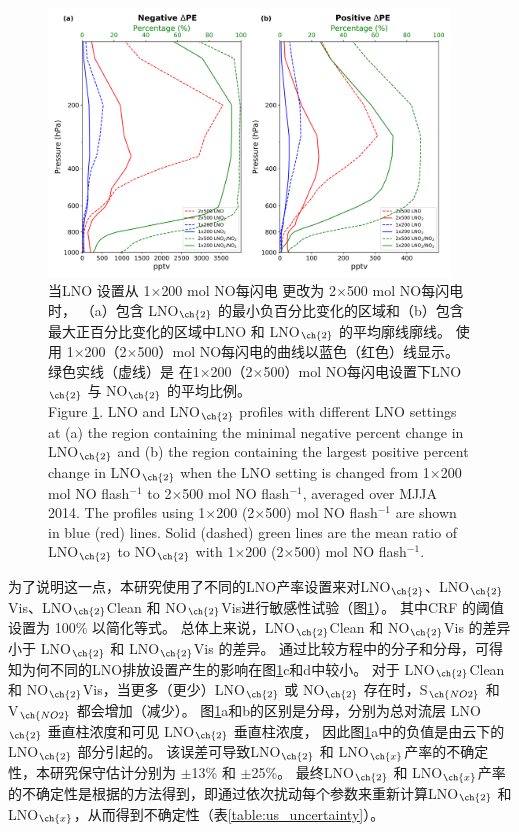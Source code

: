 \begin{figure}[H]
\centering
\includegraphics[width=0.95\textwidth]{./figures/us_lno2_profile.png}
\caption{当LNO 设置从 1$\times$200 mol NO每闪电 更改为 2$\times$500 mol NO每闪电 时，
（a）包含 LNO$_{\ch{2}}$ 的最小负百分比变化的区域和（b）包含最大正百分比变化的区域中LNO 和 LNO$_{\ch{2}}$ 的平均廓线廓线。
使用 1$\times$200（2$\times$500）mol NO每闪电的曲线以蓝色（红色）线显示。
绿色实线（虚线）是 在1$\times$200（2$\times$500）mol NO每闪电设置下LNO$_{\ch{2}}$ 与 NO$_{\ch{2}}$ 的平均比例。\\
Figure \ref{fig:us_lno2_profile}. LNO and LNO$_{\ch{2}}$ profiles with different LNO settings at (a) the region containing the minimal negative percent change in LNO$_{\ch{2}}$ and (b) the region containing the largest positive percent change in LNO$_{\ch{2}}$ when the LNO setting is changed from 1$\times$200 mol NO flash$^{-1}$ to 2$\times$500 mol NO flash$^{-1}$, averaged over MJJA 2014.
The profiles using 1$\times$200 (2$\times$500) mol NO flash$^{-1}$ are shown in blue (red) lines.
Solid (dashed) green lines are the mean ratio of LNO$_{\ch{2}}$ to NO$_{\ch{2}}$ with 1$\times$200 (2$\times$500) mol NO flash$^{-1}$.}
\label{fig:us_lno2_profile}
\end{figure}

为了说明这一点，本研究使用了不同的LNO产率设置来对LNO$_{\ch{2}}$、LNO$_{\ch{2}}$Vis、LNO$_{\ch{2}}$Clean 和 NO$_{\ch{2}}$Vis进行敏感性试验（图\ref{fig:us_lno2_profile}）。
其中CRF 的阈值设置为 100\% 以简化等式。
总体上来说，LNO$_{\ch{2}}$Clean 和 NO$_{\ch{2}}$Vis 的差异小于 LNO$_{\ch{2}}$ 和 LNO$_{\ch{2}}$Vis 的差异。
通过比较方程中的分子和分母，可得知为何不同的LNO排放设置产生的影响在图\ref{fig:us_lno2_profile}c和d中较小。
对于 LNO$_{\ch{2}}$Clean 和 NO$_{\ch{2}}$Vis，当更多（更少）LNO$_{\ch{2}}$ 或 NO$_{\ch{2}}$ 存在时，S$_{\ch{NO2}}$ 和 V$_{\ch{NO2}}$ 都会增加（减少）。
图\ref{fig:us_lno2_profile}a和b的区别是分母，分别为总对流层 LNO$_{\ch{2}}$ 垂直柱浓度和可见 LNO$_{\ch{2}}$ 垂直柱浓度，
因此图\ref{fig:us_lno2_profile}a中的负值是由云下的 LNO$_{\ch{2}}$ 部分引起的。
该误差可导致LNO$_{\ch{2}}$ 和 LNO$_{\ch{x}}$产率的不确定性，本研究保守估计分别为 $\pm$13\% 和 $\pm$25\%。
最终LNO$_{\ch{2}}$ 和 LNO$_{\ch{x}}$产率的不确定性是根据\citet{Pickering.2016,Allen.2019,Bucsela.2019,Lapierre.2020}的方法得到，即通过依次扰动每个参数来重新计算LNO$_{\ch{2}}$ 和 LNO$_{\ch{x}}$，从而得到不确定性（表\ref{table:us_uncertainty}）。


